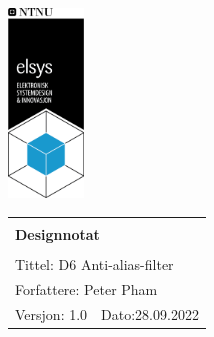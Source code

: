 \begin{minipage}[c]{0.15\textwidth}
\includegraphics[width=2cm]{Images/elsys_pos_staaende_ntnu.png}
\end{minipage}
\begin{minipage}[c]{0.80\textwidth}

\renewcommand{\arraystretch}{1.7}
\large 
\begin{tabularx}{\textwidth}{|X|X|}
\hline
\multicolumn{2}{|l|}{} \\
\multicolumn{2}{|l|}{\huge \textbf{Designnotat}} \\
\multicolumn{2}{|l|}{}  \\
\hline
\multicolumn{2}{|l|}{Tittel: 
D6 Anti-alias-filter
} \\
\hline
\multicolumn{2}{|l|}{Forfattere: 
Peter Pham
} \\
\hline
Versjon: 1.0 & Dato:28.09.2022
\\
\hline 
\end{tabularx}
\end{minipage}
\normalsize



